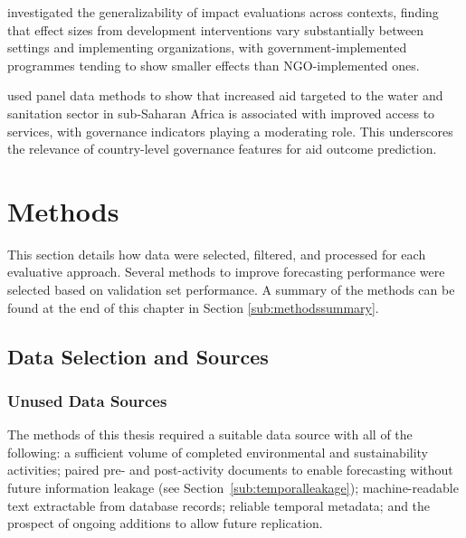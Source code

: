 \documentclass[12pt,a4paper]{article}
\let\citep\parencite
\begin{document}
\citep{vivaltHowMuchCan2020} investigated the generalizability of impact evaluations across contexts, finding that effect sizes from development interventions vary substantially between settings and implementing organizations, with government-implemented programmes tending to show smaller effects than NGO-implemented ones.

\citep{ndikumanaImpactForeignAid2017} used panel data methods to show that increased aid targeted to the water and sanitation sector in sub-Saharan Africa is associated with improved access to services, with governance indicators playing a moderating role. This underscores the relevance of country-level governance features for aid outcome prediction.
\clearpage

\section{Methods}
This section details how data were selected, filtered, and processed for each evaluative approach. Several methods to improve forecasting performance were selected based on validation set performance. A summary of the methods can be found at the end of this chapter in Section \ref{sub:methodssummary}.

\subsection{Data Selection and Sources} \label{sec:methods_for_LLM_forecasting}

\subsubsection{Unused Data Sources}
The methods of this thesis required a suitable data source with all of the following: a sufficient volume of completed environmental and sustainability activities; paired pre- and post-activity documents to enable forecasting without future information leakage (see Section~\ref{sub:temporalleakage}); machine-readable text extractable from database records; reliable temporal metadata; and the prospect of ongoing additions to allow future replication.
\end{document}
